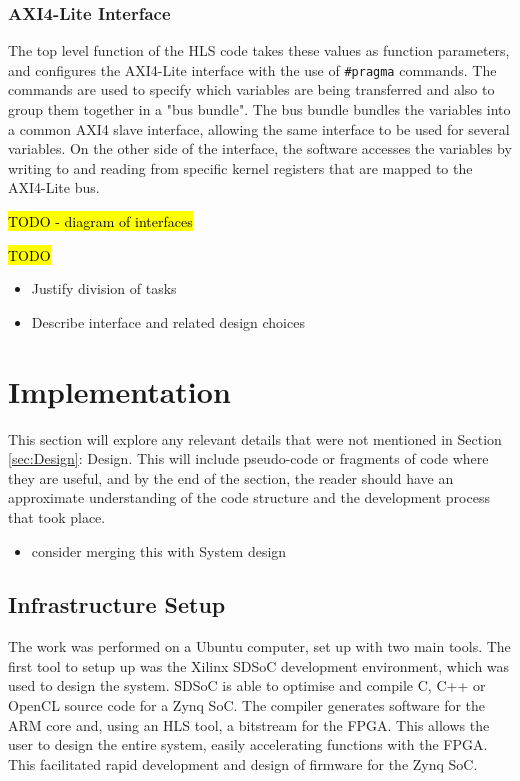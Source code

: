 \documentclass[12pt]{article}
\begin{document}
\subsubsection{AXI4-Lite Interface}
\label{sec:Design-PSnPL-AXI4L}

The top level function of the HLS code takes these values as function parameters, and configures the AXI4-Lite interface with the use of \lstinline|#pragma| commands. The commands are used to specify which variables are being transferred and also to group them together in a "bus bundle". The bus bundle bundles the variables into a common AXI4 slave interface, allowing the same interface to be used for several variables. On the other side of the interface, the software accesses the variables by writing to and reading from specific kernel registers that are mapped to the AXI4-Lite bus. 


\hl{TODO - diagram of interfaces}

\hl{TODO}

\begin{itemize}
\item Justify division of tasks
\item Describe interface and related design choices
\end{itemize}

\newpage

\section{Implementation}
\label{sec:Imp}

This section will explore any relevant details that were not mentioned in Section \ref{sec:Design}: Design. This will include pseudo-code or fragments of code where they are useful, and by the end of the section, the reader should have an approximate understanding of the code structure and the development process that took place.

\begin{itemize}
\item consider merging this with System design
\end{itemize}

\subsection{Infrastructure Setup}
\label{sec:Imp-InfSetup}


The work was performed on a Ubuntu computer, set up with two main tools. The first tool to setup up was the Xilinx SDSoC development environment, which was used to design the system. SDSoC is able to optimise and compile C, C++ or OpenCL source code for a Zynq SoC. The compiler generates software for the ARM core and, using an HLS tool, a bitstream for the FPGA. This allows the user to design the entire system, easily accelerating functions with the FPGA. This facilitated rapid development and design of firmware for the Zynq SoC.
\end{document}
